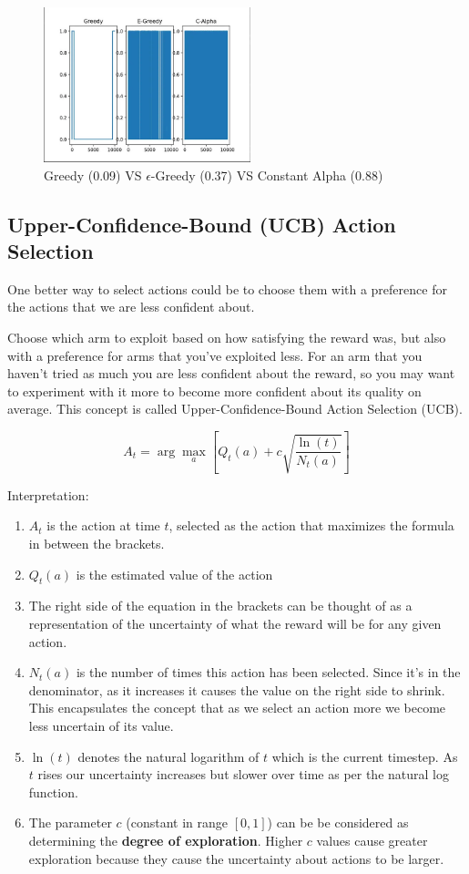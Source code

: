 \begin{figure}[h]
    \centering
    \includegraphics[height=4.5cm]{Pictures/deep-reinforcement-learning/greedy-vs-e-greedy-vs-c-alpha.jpg}
    \caption{Greedy (0.09) VS $\epsilon$-Greedy (0.37) VS Constant Alpha (0.88)}
\end{figure}

\subsection{Upper-Confidence-Bound (UCB) Action Selection \cite{medium-numsmt2-rl-ch2-part-4}}\label{MAB: Upper-Confidence-Bound (UCB) Action Selection}

One better way to select actions could be to choose them with a preference for the actions that we are less confident about.

Choose which arm to exploit based on how satisfying the reward was, but also with a preference for arms that you’ve exploited less. For an arm that you haven’t tried as much you are less confident about the reward, so you may want to experiment with it more to become more confident about its quality on average. This concept is called Upper-Confidence-Bound Action Selection (UCB).

\[
    A_t = \arg\max_a \left[ Q_t(a) + c \sqrt{\displaystyle\dfrac{\ln(t)}{N_t(a)}} \right]
\]

Interpretation:
\begin{enumerate}
    \item $A_t$ is the action at time $t$, selected as the action that maximizes the formula in between the brackets.
    \item $Q_t(a)$ is the estimated value of the action
    \item The right side of the equation in the brackets can be thought of as a representation of the uncertainty of what the reward will be for any given action.
    \item $N_t(a)$ is the number of times this action has been selected. Since it’s in the denominator, as it increases it causes the value on the right side to shrink. This encapsulates the concept that as we select an action more we become less uncertain of its value.
    \item $\ln(t)$ denotes the natural logarithm of $t$ which is the current timestep. As $t$ rises our uncertainty increases but slower over time as per the natural log function.
    \item The parameter $c$ (constant in range $[0, 1]$) can be be considered as determining the \textbf{degree of exploration}. Higher $c$ values cause greater exploration because they cause the uncertainty about actions to be larger.
\end{enumerate}


